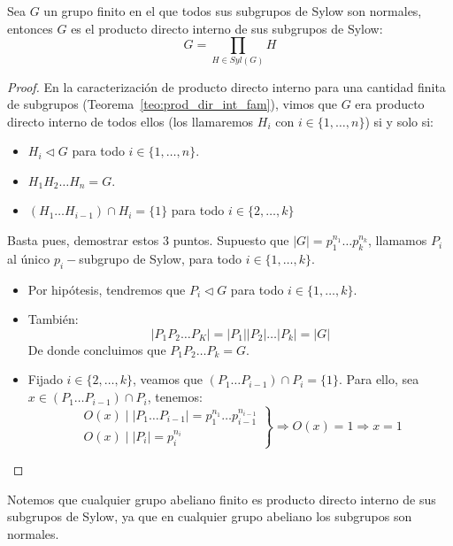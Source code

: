 \begin{teo}\label{teo:prod_grupos_sylow}
    Sea $G$ un grupo finito en el que todos sus subgrupos de Sylow son normales, entonces $G$ es el producto directo interno de sus subgrupos de Sylow:
    \begin{equation*}
        G = \prod_{H\in Syl(G)} H
    \end{equation*}
    \begin{proof}
        En la caracterización de producto directo interno para una cantidad finita de subgrupos (Teorema~\ref{teo:prod_dir_int_fam}), vimos que $G$ era producto directo interno de todos ellos (los llamaremos $H_i$ con $i \in \{1,\ldots,n\}$) si y solo si:
        \begin{itemize}
            \item $H_i \lhd G$ para todo $i \in \{1,\ldots,n\}$.
            \item $H_1H_2\ldots H_n = G$.
            \item $(H_1\ldots H_{i-1}) \cap H_i = \{1\}$ para todo $i \in \{2,\ldots,k\}$
        \end{itemize}
        Basta pues, demostrar estos 3 puntos. Supuesto que $|G| = p_1^{n_1} \ldots p_k^{n_k}$, llamamos $P_i$ al único $p_i-$subgrupo de Sylow, para todo $i \in \{1,\ldots,k\}$.

        \begin{itemize}
            \item Por hipótesis, tendremos que $P_i \lhd G$ para todo $i \in \{1,\ldots,k\}$.
            \item También:
                \begin{equation*}
                    |P_1P_2 \ldots P_K| = |P_1||P_2|\ldots |P_k| = |G|
                \end{equation*}
                De donde concluimos que $P_1P_2\ldots P_k = G$.
            \item Fijado $i \in \{2,\ldots,k\}$, veamos que $(P_1 \ldots P_{i-1}) \cap P_i = \{1\}$. Para ello, sea $x\in (P_1 \ldots P_{i-1}) \cap P_i$, tenemos:
                \begin{equation*}
                    \left.\begin{array}{r}
                        O(x) \mid |P_1\ldots P_{i-1}| = p_1^{n_1} \ldots p_{i-1}^{n_{i-1}} \\
                        O(x) \mid |P_i| = p_i^{n_i}
                    \end{array}\right\} \Longrightarrow O(x) = 1 \Longrightarrow x = 1
                \end{equation*}\qedhere
        \end{itemize}
    \end{proof}
\end{teo}

\begin{observacion}
    Notemos que cualquier grupo abeliano finito es producto directo interno de sus subgrupos de Sylow, ya que en cualquier grupo abeliano los subgrupos son normales.
\end{observacion}






